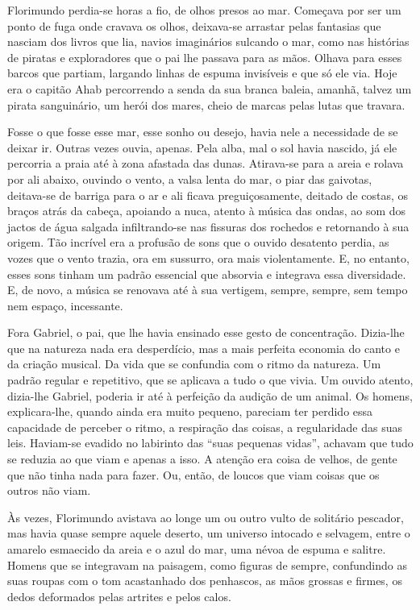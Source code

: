 Florimundo perdia-se horas a fio, de olhos presos ao mar. Começava por
ser um ponto de fuga onde cravava os olhos, deixava-se arrastar pelas
fantasias que nasciam dos livros que lia, navios imaginários sulcando o
mar, como nas histórias de piratas e exploradores que o pai lhe passava
para as mãos. Olhava para esses barcos que partiam, largando linhas de
espuma invisíveis e que só ele via. Hoje era o capitão Ahab percorrendo
a senda da sua branca baleia, amanhã, talvez um pirata sanguinário, um
herói dos mares, cheio de marcas pelas lutas que travara.

Fosse o que fosse esse mar, esse sonho ou desejo, havia nele a
necessidade de se deixar ir. Outras vezes ouvia, apenas. Pela alba, mal
o sol havia nascido, já ele percorria a praia até à zona afastada das
dunas. Atirava-se para a areia e rolava por ali abaixo, ouvindo o vento,
a valsa lenta do mar, o piar das gaivotas, deitava-se de barriga para o
ar e ali ficava preguiçosamente, deitado de costas, os braços atrás da
cabeça, apoiando a nuca, atento à música das ondas, ao som dos jactos de
água salgada infiltrando-se nas fissuras dos rochedos e retornando à sua
origem. Tão incrível era a profusão de sons que o ouvido desatento
perdia, as vozes que o vento trazia, ora em sussurro, ora mais
violentamente. E, no entanto, esses sons tinham um padrão essencial que
absorvia e integrava essa diversidade. E, de novo, a música se renovava
até à sua vertigem, sempre, sempre, sem tempo nem espaço, incessante.

Fora Gabriel, o pai, que lhe havia ensinado esse gesto de concentração.
Dizia-lhe que na natureza nada era desperdício, mas a mais perfeita
economia do canto e da criação musical. Da vida que se confundia com o
ritmo da natureza. Um padrão regular e repetitivo, que se aplicava a
tudo o que vivia. Um ouvido atento, dizia-lhe Gabriel, poderia ir até à
perfeição da audição de um animal. Os homens, explicara-lhe, quando
ainda era muito pequeno, pareciam ter perdido essa capacidade de
perceber o ritmo, a respiração das coisas, a regularidade das suas leis.
Haviam-se evadido no labirinto das ``suas pequenas vidas'', achavam que
tudo se reduzia ao que viam e apenas a isso. A atenção era coisa de
velhos, de gente que não tinha nada para fazer. Ou, então, de loucos que
viam coisas que os outros não viam.

Às vezes, Florimundo avistava ao longe um ou outro vulto de solitário
pescador, mas havia quase sempre aquele deserto, um universo intocado e
selvagem, entre o amarelo esmaecido da areia e o azul do mar, uma névoa
de espuma e salitre. Homens que se integravam na paisagem, como figuras
de sempre, confundindo as suas roupas com o tom acastanhado dos
penhascos, as mãos grossas e firmes, os dedos deformados pelas artrites
e pelos calos.

